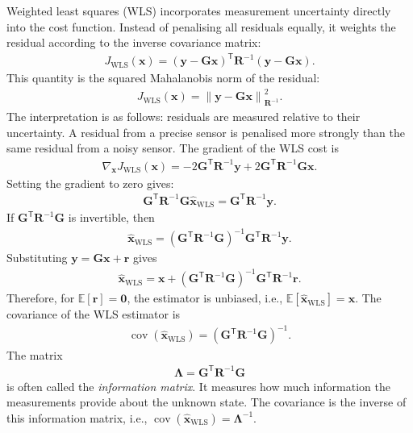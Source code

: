 \documentclass{ieeeaccess}
\begin{document}
Weighted least squares (WLS) incorporates measurement uncertainty directly into the cost function. Instead of penalising all residuals equally, it weights the residual according to the inverse covariance matrix:
\begin{align}
J_{\mathrm{WLS}}(\mathbf{x}) = \left( \mathbf{y} - \mathbf{G}\mathbf{x} \right)^{\mathsf T} \mathbf{R}^{-1} \left( \mathbf{y} - \mathbf{G}\mathbf{x} \right).
\end{align}
This quantity is the squared Mahalanobis norm of the residual:
\begin{align}
J_{\mathrm{WLS}}(\mathbf{x}) = \left\| \mathbf{y} - \mathbf{G}\mathbf{x} \right\|_{\mathbf{R}^{-1}}^2.
\end{align}
The interpretation is as follows: residuals are measured relative to their uncertainty. A residual from a precise sensor is penalised more strongly than the same residual from a noisy sensor. The gradient of the WLS cost is
\begin{align}
\nabla_{\mathbf{x}}
J_{\mathrm{WLS}}(\mathbf{x}) = -2 \mathbf{G}^{\mathsf T} \mathbf{R}^{-1} \mathbf{y} + 2 \mathbf{G}^{\mathsf T} \mathbf{R}^{-1} \mathbf{G} \mathbf{x}.
\end{align}
Setting the gradient to zero gives:
\begin{align}
\mathbf{G}^{\mathsf T}
\mathbf{R}^{-1}
\mathbf{G}
\widehat{\mathbf{x}}_{\mathrm{WLS}}
=
\mathbf{G}^{\mathsf T}
\mathbf{R}^{-1}
\mathbf{y}.
\end{align}
If $\mathbf{G}^{\mathsf T}\mathbf{R}^{-1}\mathbf{G}$ is invertible, then
\begin{align}
\widehat{\mathbf{x}}_{\mathrm{WLS}}
=
\left(
\mathbf{G}^{\mathsf T}
\mathbf{R}^{-1}
\mathbf{G}
\right)^{-1}
\mathbf{G}^{\mathsf T}
\mathbf{R}^{-1}
\mathbf{y}.
\end{align}
Substituting $\mathbf{y}=\mathbf{G}\mathbf{x}+\mathbf{r}$ gives
\begin{align}
\widehat{\mathbf{x}}_{\mathrm{WLS}}
=
\mathbf{x}
+
\left(
\mathbf{G}^{\mathsf T}
\mathbf{R}^{-1}
\mathbf{G}
\right)^{-1}
\mathbf{G}^{\mathsf T}
\mathbf{R}^{-1}
\mathbf{r}.
\end{align}
Therefore, for $\mathbb{E}
\left[\mathbf{r}\right]
=\mathbf{0}$, the estimator is unbiased, i.e., $\mathbb{E} \left[\widehat{\mathbf{x}}_{\mathrm{WLS}} \right] = \mathbf{x}$. The covariance of the WLS estimator is
\begin{align}
\operatorname{cov}
\left(
\widehat{\mathbf{x}}_{\mathrm{WLS}}
\right)
=
\left(
\mathbf{G}^{\mathsf T}
\mathbf{R}^{-1}
\mathbf{G}
\right)^{-1}.
\end{align}
The matrix
\begin{align}
\mathbf{\Lambda}
=
\mathbf{G}^{\mathsf T}
\mathbf{R}^{-1}
\mathbf{G}
\end{align}
is often called the \emph{information matrix}. It measures how much information the measurements provide about the unknown state. The covariance is the inverse of this information matrix, i.e., $\operatorname{cov} \left( \widehat{\mathbf{x}}_{\mathrm{WLS}} \right) = \mathbf{\Lambda}^{-1}$.
\end{document}
